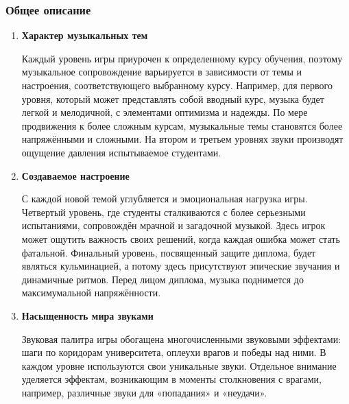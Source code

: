\subsubsection{Общее описание}
    \begin{enumerate}
    Музыкальные темы и звуковые эффекты Высшей Школы Экономики отражают звуковой ландшафт, который усиливает игровой процесс и передаёт дух учебного процесса студентов.
    \item \textbf{Характер музыкальных тем} \par
    Каждый уровень игры приурочен к определенному курсу обучения, поэтому музыкальное сопровождение варьируется в зависимости от темы и настроения, соответствующего выбранному курсу. Например, для первого уровня, который может представлять собой вводный курс, музыка будет легкой и мелодичной, с элементами оптимизма и надежды. По мере продвижения к более сложным курсам, музыкальные темы становятся более напряжёнными и сложными. На втором и третьем уровнях звуки производят ощущение давления испытываемое студентами.
    \item\textbf{Создаваемое настроение} \par
    С каждой новой темой углубляется и эмоциональная нагрузка игры. Четвертый уровень, где студенты сталкиваются с более серьезными испытаниями, сопровождён мрачной и загадочной музыкой. Здесь игрок может ощутить важность своих решений, когда каждая ошибка может стать фатальной. Финальный уровень, посвященный защите диплома, будет являться кульминацией, а потому здесь присутствуют эпические звучания и динамичные ритмов. Перед лицом диплома, музыка поднимется до максимумальной напряжённости.
    \item \textbf{Насыщенность мира звуками} \par
    Звуковая палитра игры обогащена многочисленными звуковыми эффектами: шаги по коридорам университета, оплеухи врагов и победы над ними. В каждом уровне используются свои уникальные звуки. Отдельное внимание уделяется эффектам, возникающим в моменты столкновения с врагами, например, различные звуки для «попадания» и «неудачи».
    \end{enumerate}